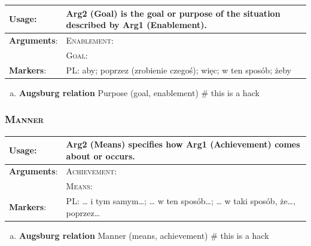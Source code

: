\documentclass{udisc}
\begin{document}
\begin{tabularx}{\textwidth}{|l|L|}
\hline

\textbf{Usage}:           &  Arg2 (Goal) is the goal or purpose of the situation described by Arg1 (Enablement). \\
\hline

\textbf{Arguments}:       &  \textsc{Enablement}: \\
                          &  \textsc{Goal}: \\
\hline

\textbf{Markers}:         &  PL: aby; poprzez (zrobienie czegoś); więc; w ten sposób; żeby \\
\hline

\end{tabularx}

\begin{enumerate}[a)]
\item \textbf{Augsburg relation} Purpose (goal, enablement)
\nonstopmode # this is a hack
\end{enumerate}
\errorstopmode



\subsubsection{\textsc{Manner}}

\begin{tabularx}{\textwidth}{|l|L|}
\hline

\textbf{Usage}:           &  Arg2 (Means) specifies how Arg1 (Achievement) comes about or occurs. \\
\hline

\textbf{Arguments}:       &  \textsc{Achievement}: \\
                          &  \textsc{Means}: \\
\hline

\textbf{Markers}:         &  PL: … i tym samym…; … w ten sposób…; … w taki sposób, że…, poprzez… \\
\hline

\end{tabularx}

\begin{enumerate}[a)]
\item \textbf{Augsburg relation} Manner (means, achievement)
\nonstopmode # this is a hack
\end{enumerate}
\errorstopmode
\end{document}
